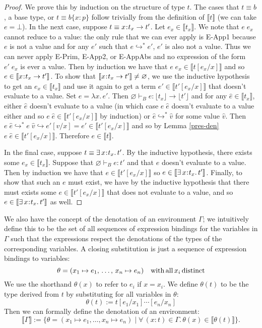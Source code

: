 \documentclass[11pt]{article}
\newcommand{\bind}{\hspace{0.05em}{:}\hspace{0.05em}} %
\newcommand{\col}{\mathbin{:}}       %
\newcommand{\lb}{\llbracket}         %
\newcommand{\rb}{\rrbracket}         %
\newcommand{\step}{\hookrightarrow}
\newcommand{\many}{\hookrightarrow^*}
\newcommand{\existype}[3]{\exists\, #1\bind #2.\, #3}
\newcommand{\functype}[3]{#1\bind #2 \rightarrow #3}
\begin{document}
\begin{proof}
We prove this by induction on the structure of type $t$. The cases that $t \equiv b$, a base type, or $t \equiv b\{x\col p\}$ follow trivially from the definition of $\lb t \rb$ (we can take $e = \bot$). In the next case, suppose $t \equiv \functype{x}{t_x}{t'}$. Let $e_x \in \lb t_x \rb$. We note that $e\; e_x$ cannot reduce to a value: the only rule that we can ever apply is {\sc E-App1} because $e$ is not a value and for any $e'$ such that $e \many e'$, $e'$ is also not a value. Thus we can never apply {\sc E-Prim}, {\sc E-App2}, or {\sc E-AppAbs} and no expression of the form $e'\; e_x$ is ever a value. Then by induction we have that $e\; e_x \in \lb t[e_x/x]\rb$ and so $e \in \lb\functype{x}{t_x}{t'}\rb$. To show that $\lb\functype{x}{t_x}{t'}\rb \neq \varnothing$, we use the inductive hypothesis to get an $e_x \in \lb t_x \rb$ and use it again to get a term $e' \in \lb t'[e_x/x] \rb$ that doesn't evaluate to a value. Set $e = \lambda x.\, e'$. Then $\varnothing \vdash_B e : \lfloor t_x \rfloor \rightarrow \lfloor t' \rfloor$ and for any $\hat e \in \lb t_x \rb$, either $\hat e$ doesn't evaluate to a value (in which case $e\; \hat e$ doesn't evaluate to a value either and so $e\; \hat e \in \lb t'[e_x/x]\rb$ by induction) or $\hat e \many \hat v$ for some value $\hat v$. Then $e\; \hat e \many e\; \hat v \step e'[v/x] = e' \in \lb t'[e_x/x]\rb$ and so by Lemma \ref{pres-den} $e\; \hat e \in \lb t'[e_x/x]\rb$. Therefore $e \in \lb t\rb$.

In the final case, suppose $t\equiv \existype{x}{t_x}{t'}$. By the inductive hypothesis, there exists some $e_x \in \lb t_x \rb$. Suppose that $\varnothing \vdash_B e : t'$ and that $e$ doesn't evaluate to a value. Then by induction we have that $e \in \lb t'[e_x/x]\rb$ so $e \in \lb\existype{x}{t_x}{t'}\rb$. Finally, to show that such an $e$ must exist, we have by the inductive hypothesis that there must exists some $e\in\lb t'[e_x/x]\rb$ that does not evaluate to a value, and so $e\in \lb\existype{x}{t_x}{t'}\rb$ as well.
\end{proof}

We also have the concept of the denotation of an environment $\Gamma$; we intuitively define this to be the set of all sequences of expression bindings for the variables in $\Gamma$ such that the expressions respect the denotations of the types of the corresponding variables.
A closing substitution is just a sequence of expression bindings to variables:
\[
\theta = (x_1\mapsto e_1,\,\ldots,\, x_n\mapsto e_n)
\quad {\rm with\, all}\, x_i\, {\rm distinct}
\]
We use the shorthand $\theta(x)$ to refer to $e_i$ if $x = x_i$. We define $\theta(t)$ to be the type derived from $t$ by substituting for all variables in $\theta$:
\[
\theta(t) := t[e_1/x_1]\cdots[e_n/x_n]
\]
Then we can formally define the denotation of an environment:
\[
\lb \Gamma \rb := \{ \theta = (x_1 \mapsto e_1,\ldots, x_n \mapsto e_n) \; | \;
\forall\, (x:t) \in \Gamma.\, \theta(x) \in \lb\theta(t)\rb \}.
\]
\end{document}
